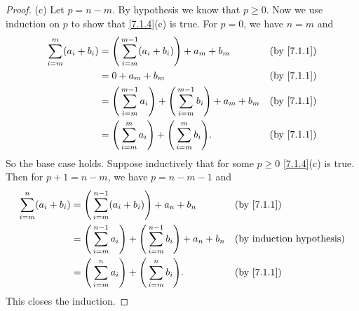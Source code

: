 \begin{proof}{(c)}
  Let \(p = n - m\).
  By hypothesis we know that \(p \geq 0\).
  Now we use induction on \(p\) to show that \cref{7.1.4}(c) is true.
  For \(p = 0\), we have \(n = m\) and
  \begin{align*}
    \sum_{i = m}^m (a_i + b_i) & = \Bigg(\sum_{i = m}^{m - 1} (a_i + b_i)\Bigg) + a_m + b_m                                &  & \text{(by \cref{7.1.1})} \\
                               & = 0 + a_m + b_m                                                                           &  & \text{(by \cref{7.1.1})} \\
                               & = \Bigg(\sum_{i = m}^{m - 1} a_i\Bigg) + \Bigg(\sum_{i = m}^{m - 1} b_i\Bigg) + a_m + b_m &  & \text{(by \cref{7.1.1})} \\
                               & = \Bigg(\sum_{i = m}^m a_i\Bigg) + \Bigg(\sum_{i = m}^m b_i\Bigg).                        &  & \text{(by \cref{7.1.1})}
  \end{align*}
  So the base case holds.
  Suppose inductively that for some \(p \geq 0\) \cref{7.1.4}(c) is true.
  Then for \(p + 1 = n - m\), we have \(p = n - m - 1\) and
  \begin{align*}
    \sum_{i = m}^n (a_i + b_i) & = \Bigg(\sum_{i = m}^{n - 1} (a_i + b_i)\Bigg) + a_n + b_n                                &  & \text{(by \cref{7.1.1})}         \\
                               & = \Bigg(\sum_{i = m}^{n - 1} a_i\Bigg) + \Bigg(\sum_{i = m}^{n - 1} b_i\Bigg) + a_n + b_n &  & \text{(by induction hypothesis)} \\
                               & = \Bigg(\sum_{i = m}^n a_i\Bigg) + \Bigg(\sum_{i = m}^n b_i\Bigg).                        &  & \text{(by \cref{7.1.1})}
  \end{align*}
  This closes the induction.
\end{proof}

